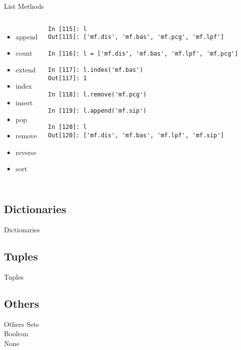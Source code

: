 \documentclass{beamer}
\begin{document}
\begin{frame}[fragile]{List Methods}
\begin{columns}[c]
\column{2.5in}
\begin{itemize}
\item{append}
\item{count}
\item{extend}
\item{index}
\item{insert}
\item{pop}
\item{remove}
\item{reverse}
\item{sort}
\end{itemize}

\column{2.5in}
\begin{lstlisting}
In [115]: l
Out[115]: ['mf.dis', 'mf.bas', 'mf.pcg', 'mf.lpf']

In [116]: l = ['mf.dis', 'mf.bas', 'mf.lpf', 'mf.pcg']

In [117]: l.index('mf.bas')
Out[117]: 1

In [118]: l.remove('mf.pcg')

In [119]: l.append('mf.sip')

In [120]: l
Out[120]: ['mf.dis', 'mf.bas', 'mf.lpf', 'mf.sip']
\end{lstlisting}
\end{columns}
\end{frame}

\subsection{Dictionaries}
\begin{frame}[fragile]{Dictionaries}
\end{frame}

\subsection{Tuples}
\begin{frame}[fragile]{Tuples}
\end{frame}

\subsection{Others}
\begin{frame}[fragile]{Others}
Sets\\
Boolean\\
None
\end{frame}
\end{document}
